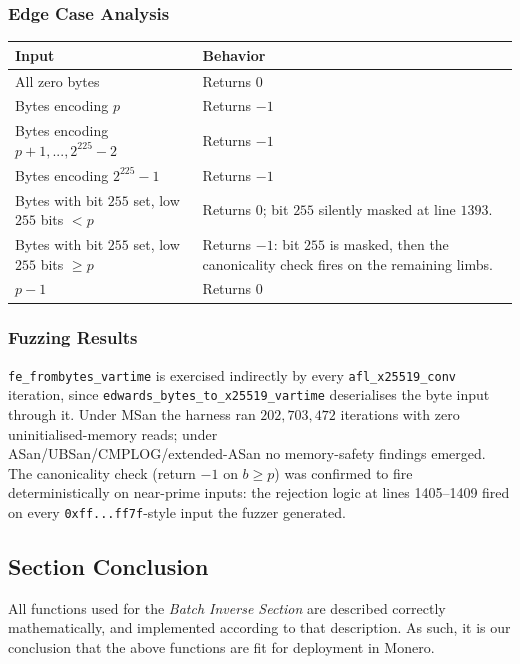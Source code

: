 \documentclass[12pt,titlepage,table]{article}
\begin{document}
\subsubsection{Edge Case Analysis}
\begin{table}[htbp]
\centering
{
\begin{tabular}{| p{2.3in} | p{3.8in} |}
\hline
\textbf{Input} & \textbf{Behavior} \\
\hline
\hline
All zero bytes & Returns $0$ \\
Bytes encoding $p$ & Returns $-1$ \\
Bytes encoding $p+1,..., 2^{225}-2$ & Returns $-1$ \\
Bytes encoding $2^{225} - 1$ & Returns $-1$ \\
Bytes with bit $255$ set, low $255$ bits $< p$ & Returns $0$; bit $255$ silently masked at line $1393$. \\
Bytes with bit $255$ set, low $255$ bits $\geq p$ & Returns $-1$: bit $255$ is masked, then the canonicality check fires on the remaining limbs. \\
$p-1$ & Returns $0$ \\
\hline
\end{tabular}}
\end{table}

\subsubsection{Fuzzing Results}
\verb+fe_frombytes_vartime+ is exercised indirectly by every \verb+afl_x25519_conv+ iteration, since \verb+edwards_bytes_to_x25519_vartime+ deserialises the byte input through it.  Under MSan the harness ran $202{,}703{,}472$ iterations with zero uninitialised-memory reads; under \\ ASan/UBSan/CMPLOG/extended-ASan no memory-safety findings emerged.  The canonicality check (return $-1$ on $b \geq p$) was confirmed to fire deterministically on near-prime inputs: the rejection logic at lines 1405--1409 fired on every \verb+0xff...ff7f+-style input the fuzzer generated.

\newpage
\subsection[Section Conclusion]{Section Conclusion \hfill \checkmark}
All functions used for the \textit{Batch Inverse Section} are described correctly mathematically, and implemented according to that description. As such, it is our conclusion that the above functions are fit for deployment in Monero.
\end{document}
